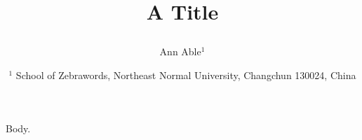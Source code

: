 \documentclass{article}
\begin{document}
\title{\textbf{A Title}
\author{Ann Able$^{1}$
 \date{$^1$ School of Zebrawords, Northeast Normal University, Changchun 130024, China}}}
\maketitle
\date{}
Body.
\end{document}

